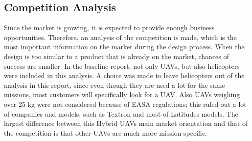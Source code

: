 \subsection{Competition Analysis}
Since the market is growing, it is expected to provide enough business opportunities. Therefore, an analysis of the competition is made, which is the most important information on the market during the design process. When the design is too similar to a product that is already on the market, chances of success are smaller. In the baseline report, not only UAVs, but also helicopters were included in this analysis. A choice was made to leave helicopters out of the analysis in this report, since even though they are used a lot for the same missions, most customers will specifically look for a UAV. Also UAVs weighing over 25 kg were not considered because of EASA regulations; this ruled out a lot of companies and models, such as Textron and most of Latitudes models. The largest difference between this Hybrid UAVs main market orientation and that of the competition is that other UAVs are much more mission specific.%

